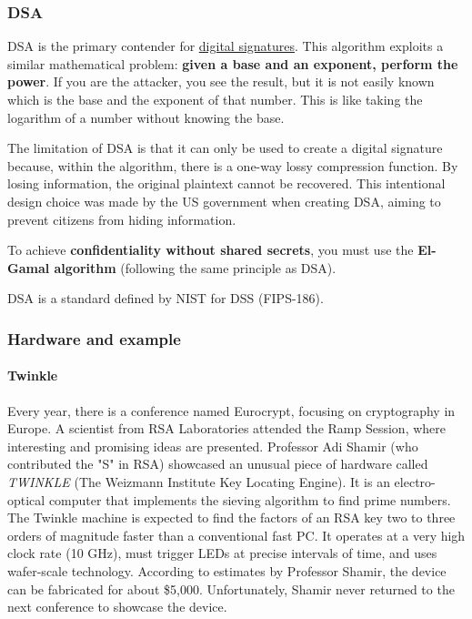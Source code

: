 \subsubsection{DSA}
DSA is the primary contender for \underline{digital signatures}. This algorithm exploits a similar mathematical problem: \textbf{given a base and an exponent, perform the power}. If you are the attacker, you see the result, but it is not easily known which is the base and the exponent of that number. This is like taking the logarithm of a number without knowing the base.

The limitation of DSA is that it can only be used to create a digital signature because, within the algorithm, there is a one-way lossy compression function. By losing information, the original plaintext cannot be recovered. This intentional design choice was made by the US government when creating DSA, aiming to prevent citizens from hiding information.

To achieve \textbf{confidentiality without shared secrets}, you must use the \textbf{El-Gamal algorithm} (following the same principle as DSA).

DSA is a standard defined by NIST for DSS (FIPS-186).



\subsubsection{Hardware and example}

\paragraph{Twinkle}
Every year, there is a conference named Eurocrypt, focusing on cryptography in Europe. A scientist from RSA Laboratories attended the Ramp Session, where interesting and promising ideas are presented. Professor Adi Shamir (who contributed the "S" in RSA) showcased an unusual piece of hardware called \textit{TWINKLE} (The Weizmann Institute Key Locating Engine). It is an electro-optical computer that implements the sieving algorithm to find prime numbers. The Twinkle machine is expected to find the factors of an RSA key two to three orders of magnitude faster than a conventional fast PC. It operates at a very high clock rate (10 GHz), must trigger LEDs at precise intervals of time, and uses wafer-scale technology. According to estimates by Professor Shamir, the device can be fabricated for about \$5,000. Unfortunately, Shamir never returned to the next conference to showcase the device.

